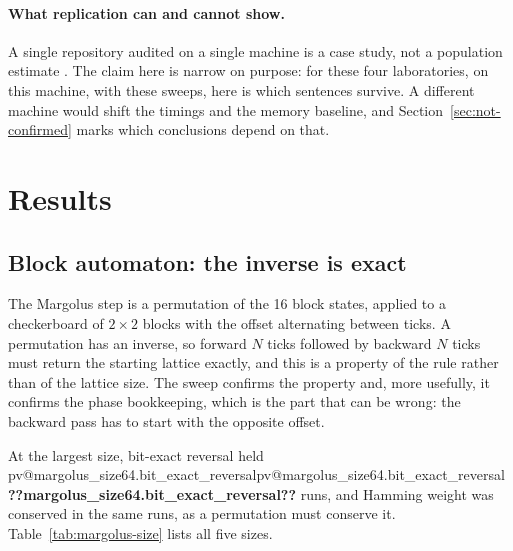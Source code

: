 \documentclass[11pt,a4paper]{article}
\makeatletter
\newcommand{\val}[1]{\ifcsname pv@#1\endcsname\csname pv@#1\endcsname\else\textbf{??#1??}\fi}
\makeatother
\begin{document}
\paragraph{What replication can and cannot show.} A single repository audited on a single machine
is a case study, not a population estimate \citep{baker2016,osc2015}. The claim here is narrow on
purpose: for these four laboratories, on this machine, with these sweeps, here is which sentences
survive. A different machine would shift the timings and the memory baseline, and
Section~\ref{sec:not-confirmed} marks which conclusions depend on that.

\section{Results}
\label{sec:results}

\subsection{Block automaton: the inverse is exact}
\label{sec:margolus}

The Margolus step is a permutation of the 16 block states, applied to a checkerboard of
$2\times2$ blocks with the offset alternating between ticks. A permutation has an inverse, so
forward $N$ ticks followed by backward $N$ ticks must return the starting lattice exactly, and
this is a property of the rule rather than of the lattice size. The sweep confirms the property
and, more usefully, it confirms the phase bookkeeping, which is the part that can be wrong: the
backward pass has to start with the opposite offset.

At the largest size, bit-exact reversal held \val{margolus_size64.bit_exact_reversal} runs, and
Hamming weight was conserved in the same runs, as a permutation must conserve it.
Table~\ref{tab:margolus-size} lists all five sizes.
\end{document}
